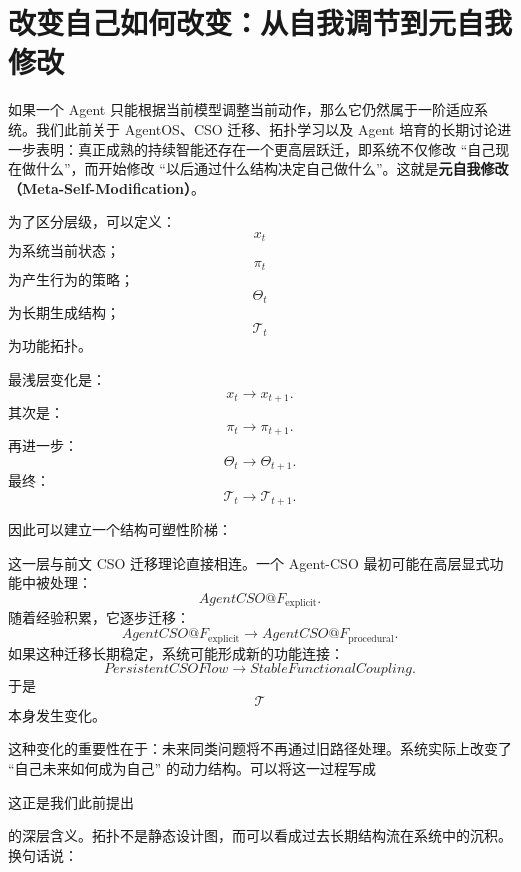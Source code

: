 \section{改变自己如何改变：从自我调节到元自我修改}

如果一个 Agent 只能根据当前模型调整当前动作，那么它仍然属于一阶适应系统。我们此前关于 AgentOS、CSO 迁移、拓扑学习以及 Agent 培育的长期讨论进一步表明：真正成熟的持续智能还存在一个更高层跃迁，即系统不仅修改 ``自己现在做什么''，而开始修改 ``以后通过什么结构决定自己做什么''。这就是\textbf{元自我修改（Meta-Self-Modification）}。

为了区分层级，可以定义：
\[
x_t
\]
为系统当前状态；
\[
\pi_t
\]
为产生行为的策略；
\[
\Theta_t
\]
为长期生成结构；
\[
\mathcal T_t
\]
为功能拓扑。

最浅层变化是：
\[
x_t\rightarrow x_{t+1}.
\]
其次是：
\[
\pi_t\rightarrow\pi_{t+1}.
\]
再进一步：
\[
\Theta_t\rightarrow\Theta_{t+1}.
\]
最终：
\[
\mathcal T_t\rightarrow\mathcal T_{t+1}.
\]

因此可以建立一个结构可塑性阶梯：
\begin{statementbox}
\centering
{}
\end{statementbox}

这一层与前文 CSO 迁移理论直接相连。一个 Agent-CSO 最初可能在高层显式功能中被处理：
\[
AgentCSO@F_{\mathrm{explicit}}.
\]
随着经验积累，它逐步迁移：
\[
AgentCSO@F_{\mathrm{explicit}}
\rightarrow
AgentCSO@F_{\mathrm{procedural}}.
\]
如果这种迁移长期稳定，系统可能形成新的功能连接：
\[
PersistentCSOFlow
\rightarrow
StableFunctionalCoupling.
\]
于是
\[
\mathcal T
\]
本身发生变化。

这种变化的重要性在于：未来同类问题将不再通过旧路径处理。系统实际上改变了 ``自己未来如何成为自己'' 的动力结构。可以将这一过程写成
\begin{statementbox}
\centering
{}
\end{statementbox}

这正是我们此前提出
\begin{statementbox}
\centering
{}
\end{statementbox}
的深层含义。拓扑不是静态设计图，而可以看成过去长期结构流在系统中的沉积。换句话说：
\begin{statementbox}
\centering
{}
\end{statementbox}

